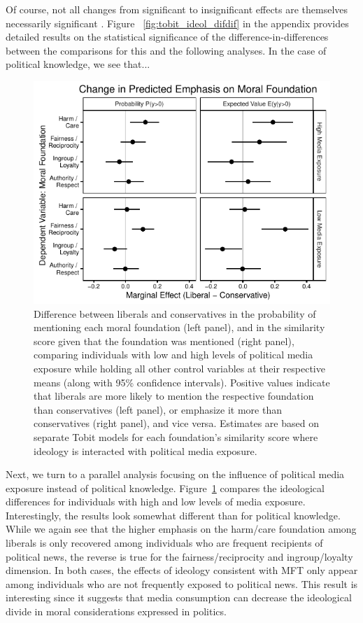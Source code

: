 \documentclass[12pt]{article}
\begin{document}
Of course, not all changes from significant to insignificant effects are themselves necessarily significant \citep[c.f.,][]{gelman2006difference}. Figure ~\ref{fig:tobit_ideol_difdif} in the appendix provides detailed results on the statistical significance of the difference-in-differences between the comparisons for this and the following analyses. In the case of political knowledge, we see that...

\begin{figure}[ht]\centering
\includegraphics{../calc/fig/tobit_ideol_media.pdf}
\caption{Difference between liberals and conservatives in the probability of mentioning each moral foundation (left panel), and in the similarity score given that the foundation was mentioned (right panel), comparing individuals with low and high levels of political media exposure while holding all other control variables at their respective means (along with 95\% confidence intervals). Positive values indicate that liberals are more likely to mention the respective foundation than conservatives (left panel), or emphasize it more than conservatives (right panel), and vice versa. Estimates are based on separate Tobit models for each foundation's similarity score where ideology is interacted with political media exposure.}\label{fig:tobit_ideol_media}
\end{figure}

Next, we turn to a parallel analysis focusing on the influence of political media exposure instead of political knowledge. Figure~\ref{fig:tobit_ideol_media} compares the ideological differences for individuals with high and low levels of media exposure. Interestingly, the results look somewhat different than for political knowledge. While we again see that the higher emphasis on the harm/care foundation among liberals is only recovered among individuals who are frequent recipients of political news, the reverse is true for the fairness/reciprocity and ingroup/loyalty dimension. In both cases, the effects of ideology consistent with MFT only appear among individuals who are not frequently exposed to political news. This result is interesting since it suggests that media consumption can decrease the ideological divide in moral considerations expressed in politics.
\end{document}
